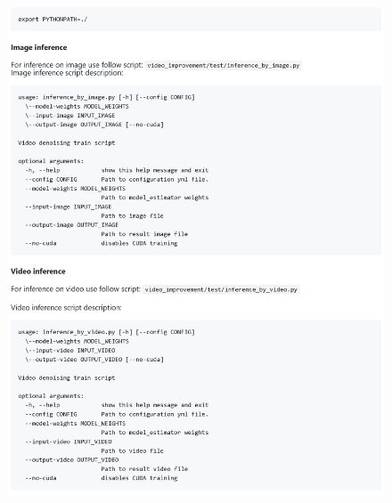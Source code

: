 \begin{appendices}
\begin{figure}[h]
	\centering
	\includegraphics[width=\textwidth]{img/markdown/README_4}
	\label{fig:markdown_4}
\end{figure}

\end{appendices}

\printbibliography[%
    heading=bibintoc%
]





